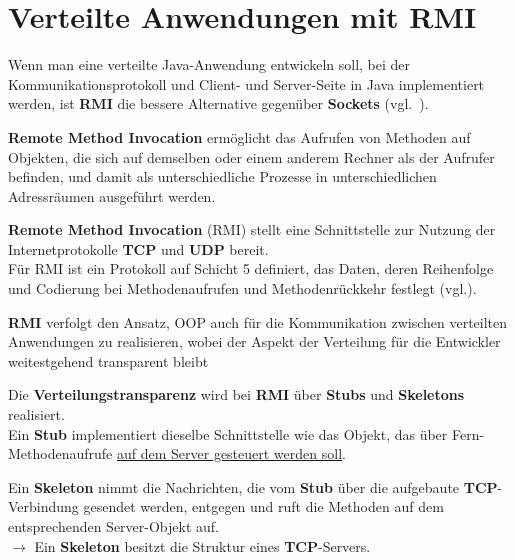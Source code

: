 \section{Verteilte Anwendungen mit RMI}\label{sec:distributedrmiapplications}

Wenn man eine verteilte Java-Anwendung entwickeln soll, bei der Kommunikationsprotokoll und Client- und Server-Seite in Java implementiert werden, ist \textbf{RMI} die bessere Alternative gegenüber  \textbf{Sockets} (vgl.~\cite[311]{Oec22}).

\begin{tcolorbox}[enlarge top by=0.5cm,enlarge bottom by=0.5cm]
    \textbf{Remote Method Invocation} ermöglicht das Aufrufen von Methoden auf Objekten, die sich auf demselben oder einem anderem Rechner als der Aufrufer befinden, und damit als unterschiedliche Prozesse in unterschiedlichen Adressräumen ausgeführt werden.
\end{tcolorbox}

\noindent
\textbf{Remote Method Invocation} (RMI) stellt eine Schnittstelle zur Nutzung der Internetprotokolle \textbf{TCP} und \textbf{UDP} bereit.\\
Für RMI ist ein Protokoll auf Schicht 5 definiert, das Daten, deren Reihenfolge und Codierung bei Methodenaufrufen und Methodenrückkehr festlegt (vgl.\cite[402]{Oec22}).

\noindent
\textbf{RMI} verfolgt den Ansatz, OOP auch für die Kommunikation zwischen verteilten Anwendungen zu realisieren, wobei der Aspekt der Verteilung für die Entwickler weitestgehend transparent bleibt


\noindent
Die \textbf{Verteilungstransparenz} wird bei \textbf{RMI} über \textbf{Stubs} und \textbf{Skeletons} realisiert.\\

\noindent
Ein \textbf{Stub} implementiert dieselbe Schnittstelle wie das Objekt, das über Fern-Methodenaufrufe \ul{auf dem Server gesteuert werden soll}.

\noindent
Ein \textbf{Skeleton} nimmt die Nachrichten, die vom \textbf{Stub} über die aufgebaute \textbf{TCP}-Verbindung gesendet werden, entgegen und ruft die Methoden auf dem entsprechenden Server-Objekt auf.\\
$\rightarrow$ Ein \textbf{Skeleton} besitzt die Struktur eines \textbf{TCP}-Servers.



